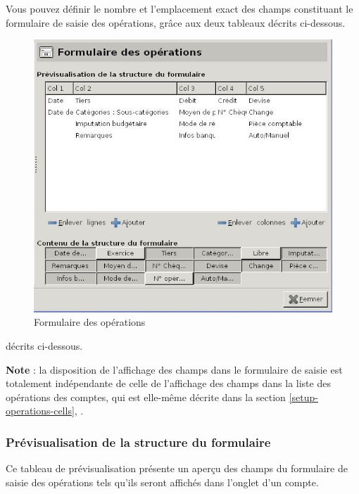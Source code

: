 Vous pouvez définir le nombre et l'emplacement exact des champs constituant le formulaire de saisie des opérations, grâce aux deux tableaux \ifIllustration décrits ci-dessous.
\begin{figure}[htbp]
\begin{center}
\includegraphics[scale=0.5]{image/screenshot/setup_transactions_form}
\end{center}
\caption{Formulaire des opérations}
\label{setup-transactions-form-img}
\end{figure}
\else décrits ci-dessous.
\fi

\textbf{Note} : la disposition de l'affichage des champs dans le formulaire de saisie est totalement  indépendante de celle de  l'affichage des champs dans la liste des opérations des comptes, qui est elle-même décrite dans la section \vref{setup-operations-cells}, .


\subsubsection{Prévisualisation de la structure du formulaire\label{setup-form-content-display}}

Ce tableau de prévisualisation présente un aperçu des champs du formulaire de saisie des opérations tels qu'ils seront affichés dans l'onglet  d'un compte.


